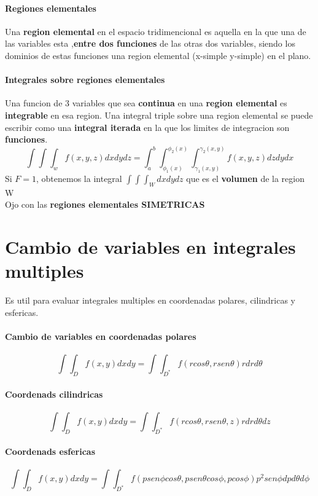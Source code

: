 \documentclass[11pt]{article}
\begin{document}
\paragraph{Regiones elementales}
Una \textbf{region elemental} en el espacio tridimencional es aquella en la que una de las variables esta ,\textbf{entre dos funciones} de las otras dos variables, siendo los dominios de estas funciones una region elemental (x-simple y-simple) en el plano.
\paragraph{Integrales sobre regiones elementales}
Una funcion de 3 variables que sea \textbf{continua} en una \textbf{region elemental} es \textbf{integrable} en esa region. Una integral triple sobre una region elemental se puede escribir como una \textbf{integral iterada} en la que los limites de integracion son \textbf{funciones}.
\begin{equation*}
	\int\int\int_w f(x,y,z)dxdydz = \int_a^b \int_{\phi_1(x)}^{\phi_2(x)}\int_{\gamma_1(x,y)}^{\gamma_2(x,y)}f(x,y,z)dzdydx
\end{equation*}
Si $F = 1$, obtenemos la integral $\int\int\int_W dxdydz$ que es el \textbf{volumen} de la region W\\
\linebreak
Ojo con las \textbf{regiones elementales SIMETRICAS}
\section{Cambio de variables en integrales multiples}
Es util para evaluar integrales multiples en coordenadas polares, cilindricas y esfericas.
\paragraph{Cambio de variables en coordenadas polares}
\begin{equation*}
	\int\int_D f(x,y)dxdy = \int\int_{D^*}f(rcos\theta, rsen\theta)rdrd\theta
\end{equation*}
\paragraph{Coordenads cilindricas}
\begin{equation*}
	\int\int_D f(x,y)dxdy = \int\int_{D^*}f(rcos\theta, rsen\theta,z)rdrd\theta dz
\end{equation*}
\paragraph{Coordenads esfericas}
\begin{equation*}
	\int\int_D f(x,y)dxdy = \int\int_{D^*}f(psen\phi cos\theta, psen\theta cos\phi,pcos\phi)p^2 sen\phi dpd\theta d\phi
\end{equation*}
\end{document}
